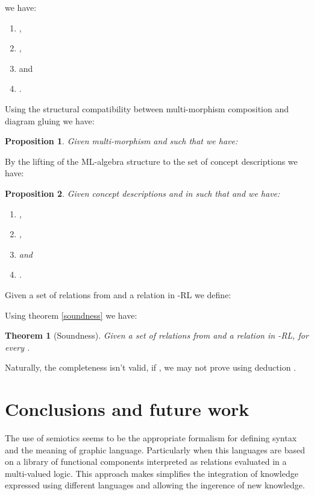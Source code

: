 \documentclass[oribibl]{llncs}
\newtheorem{thm}{Theorem}
\newtheorem{prop}{Proposition}
\begin{document}
we have:
\begin{enumerate}
  \item ,
  \item ,
  \item  and
  \item .
\end{enumerate}
Using the structural compatibility between multi-morphism composition
and diagram gluing we have:

\begin{prop}
Given multi-morphism  and  such that
 we have: 
\end{prop}

By the lifting of the ML-algebra structure to the set of concept
descriptions we have:
\begin{prop}
Given concept descriptions  and  in  such that
 and  we
have:
\begin{enumerate}
  \item ,
  \item ,
  \item 
  and
  \item .
\end{enumerate}
\end{prop}

Given a set of relations  from  and  a
relation in -RL we define:

Using theorem \ref{soundness} we have:
\begin{thm}[Soundness]
Given a set of relations  from  and  a
relation in -RL,
 for every
.
\end{thm}
Naturally, the completeness isn't valid, if , we may not prove using deduction .

\section{Conclusions and future work}\label{conclusions}

The use of semiotics seems to be the appropriate formalism for defining syntax and the meaning of graphic language. Particularly when this languages are based on a library of functional components interpreted as relations evaluated in a multi-valued logic. This approach makes simplifies the integration of knowledge expressed using different languages and allowing the ingerence of new knowledge.






\end{document}
